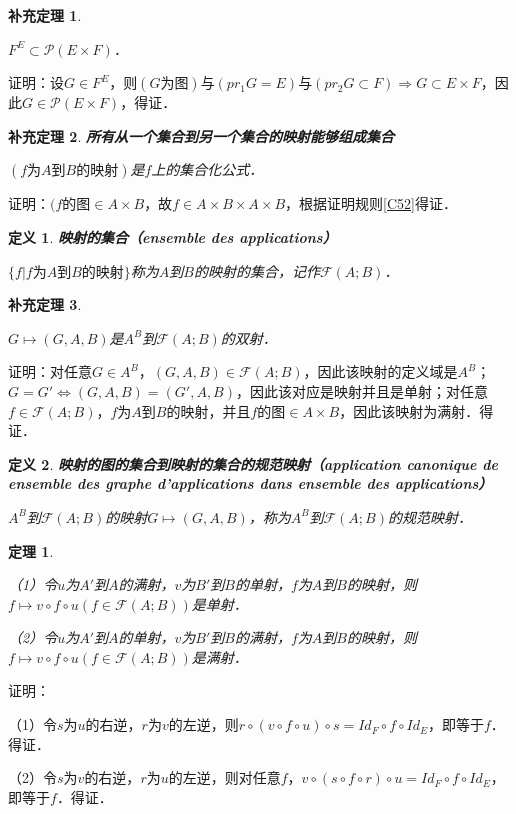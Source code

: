\documentclass[12pt, a4paper, oneside]{book}
\newtheorem{theo}{定理}
\newtheorem{cor}{补充定理}
\newtheorem{de}{定义}
\begin{document}
			\begin{cor}\label{cor121}
				\hfill\par
				$F^E\subset \mathcal{P}(E\times F)$．
			\end{cor}
			证明：设$G\in F^E$，则$(G\text{为图})\text{与}(pr_1G=E)\text{与}(pr_2G\subset F)\Rightarrow G\subset E\times F$，因此$G\in \mathcal{P}(E\times F)$，得证．
						
			\begin{cor}\label{cor122}
				\textbf{所有从一个集合到另一个集合的映射能够组成集合}
				\par
				$(f\text{为}A\text{到}B\text{的映射})$是$f$上的集合化公式．
			\end{cor}
			证明：$(f\text{的图}\in A\times B$，故$f\in A\times B\times A\times B$，根据证明规则\ref{C52}得证．
			
			\begin{de}
				\textbf{映射的集合（ensemble des applications）}
				\par
				$\{f|f\textbf{为}A\text{到}B\text{的映射}\}$称为$A$到$B$的映射的集合，记作$\mathcal{F}(A; B)$．
			\end{de}
							
			\begin{cor}\label{cor123}
				\hfill\par
				$G\mapsto (G, A, B)$是$A^B$到$\mathcal{F}(A; B)$的双射．
			\end{cor}
			证明：对任意$G\in A^B$，$(G, A, B)\in \mathcal{F}(A; B)$，因此该映射的定义域是$A^B$；$G=G'\Leftrightarrow (G, A, B)=(G', A, B)$，因此该对应是映射并且是单射；对任意$f\in \mathcal{F}(A; B)$，$f$为$A$到$B$的映射，并且$f\text{的图}\in A\times B$，因此该映射为满射．得证．

			\begin{de}
				\textbf{映射的图的集合到映射的集合的规范映射（application canonique de ensemble des graphe d'applications dans ensemble des applications）}
				\par
				$A^B$到$\mathcal{F}(A; B)$的映射$G\mapsto (G, A, B)$，称为$A^B$到$\mathcal{F}(A; B)$的规范映射．
			\end{de}
						
			\begin{theo}\label{theo37}
				\hfill\par
				（1）令$u$为$A'$到$A$的满射，$v$为$B'$到$B$的单射，$f$为$A$到$B$的映射，则$f\mapsto v\circ f\circ u(f\in \mathcal{F}(A; B))$是单射．
				\par
				（2）令$u$为$A'$到$A$的单射，$v$为$B'$到$B$的满射，$f$为$A$到$B$的映射，则$f\mapsto v\circ f\circ u(f\in \mathcal{F}(A; B))$是满射．
			\end{theo}
			证明：
			\par
			（1）令$s$为$u$的右逆，$r$为$v$的左逆，则$r\circ (v\circ f\circ u)\circ s=Id_F\circ f\circ Id_E$，即等于$f$．得证．
			\par
			（2）令$s$为$v$的右逆，$r$为$u$的左逆，则对任意$f$，$v\circ (s\circ f\circ r)\circ u=Id_F\circ f\circ Id_E$，即等于$f$．得证．
						
\end{document}
